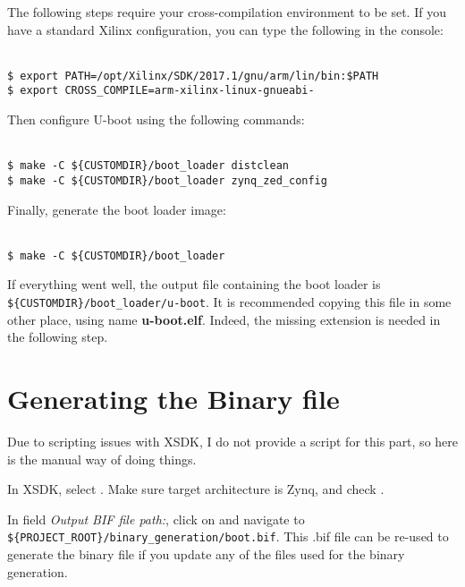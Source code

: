 \documentclass[openany,a4paper]{book}
\begin{document}
The following steps require your cross-compilation environment to be set.
If you have a standard Xilinx configuration, you can type the following in the console:

\begin{tabbing}
\kill \hspace{1cm} \= \\
\> \texttt{\$ export PATH=/opt/Xilinx/SDK/2017.1/gnu/arm/lin/bin:\$PATH}\\
\> \texttt{\$ export CROSS\_COMPILE=arm-xilinx-linux-gnueabi-}\\
\end{tabbing}

Then configure U-boot using the following commands:

\begin{tabbing}
\kill \hspace{1cm} \= \\
\> \texttt{\$ make -C \$\{CUSTOMDIR\}/boot\_loader distclean}\\
\> \texttt{\$ make -C \$\{CUSTOMDIR\}/boot\_loader zynq\_zed\_config}\\
\end{tabbing}

Finally, generate the boot loader image:

\begin{tabbing}
\kill \hspace{1cm} \= \\
\> \texttt{\$ make -C \$\{CUSTOMDIR\}/boot\_loader}\\
\end{tabbing}

If everything went well, the output file containing the boot loader is \nolinkurl{${CUSTOMDIR}/boot_loader/u-boot}.
It is recommended copying this file in some other place, using name \textbf{u-boot.elf}.
Indeed, the missing extension is needed in the following step.

\section{Generating the Binary file}

Due to scripting issues with XSDK, I do not provide a script for this part, so here is the manual way of doing things.

In XSDK, select .
Make sure target architecture is Zynq, and check .

In field \textit{Output BIF file path:}, click on  and navigate to \nolinkurl{${PROJECT_ROOT}/binary_generation/boot.bif}.
This .bif file can be re-used to generate the binary file if you update any of the files used for the binary generation.
\end{document}
